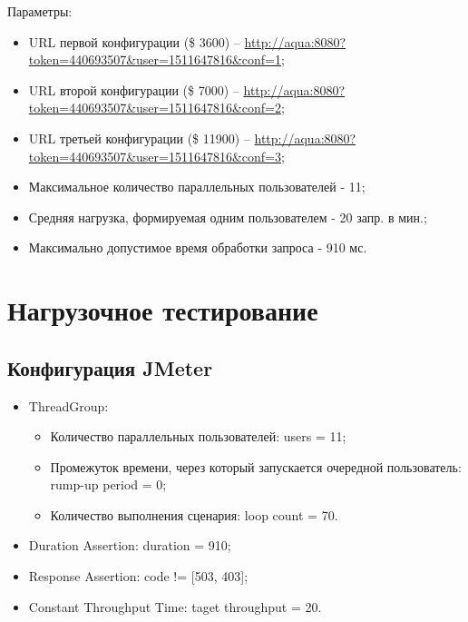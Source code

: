 \documentclass[a4paper,10pt]{article}
\begin{document}
	Параметры:
	\begin{itemize}
        \item URL первой конфигурации (\$ 3600) --  \url{http://aqua:8080?token=440693507&user=1511647816&conf=1};
        \item URL второй конфигурации (\$ 7000) --   \url{http://aqua:8080?token=440693507&user=1511647816&conf=2};
        \item URL третьей конфигурации (\$ 11900) -- \url{http://aqua:8080?token=440693507&user=1511647816&conf=3};
        \item Максимальное количество параллельных пользователей - 11;
        \item Средняя нагрузка, формируемая одним пользователем - 20 запр. в мин.;
        \item Максимально допустимое время обработки запроса - 910 мс.
	\end{itemize}

\section*{Нагрузочное тестирование}
	\subsection*{Конфигурация JMeter}
		\begin{itemize}
			\item ThreadGroup:
				\begin{itemize}
                    \item Количество параллельных пользователей: users = 11;
                    \item Промежуток времени, через который запускается очередной пользователь: rump-up period = 0;
                    \item Количество выполнения сценария: loop count = 70.
				\end{itemize}
			\item Duration Assertion: duration = 910;
			\item Response Assertion: code != [503, 403];
			\item Constant Throughput Time: taget throughput = 20.
		\end{itemize}
\end{document}
